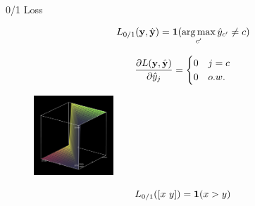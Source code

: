 \documentclass{beamer}
\begin{document}
\begin{frame}{0/1 Loss}
  

  \[ L_{0/1}(\boldy, \hat{\boldy}) =  \indicator(\argmax_{c'} \hat{y}_{c'} \neq c)   \]


\[ \frac{\partial L(\mathbf{y}, \hat{\mathbf{y}})}{\partial \hat{y}_j} = \begin{cases}0 & j = c\\ 0 & o.w. \end{cases}  \]

      \begin{figure}
        \centering
      \includegraphics[width=3cm]{argmax}
      \end{figure}
      \[L_{0/1}([x\ y]) = \mathbf{1}(x > y) \]      

\end{frame}
\end{document}
